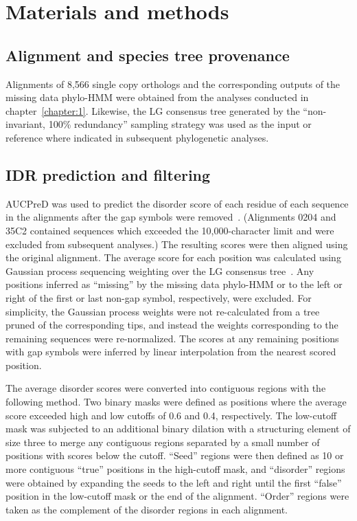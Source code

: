 \section{Materials and methods}

\subsection{Alignment and species tree provenance}
Alignments of 8,566 single copy orthologs and the corresponding outputs of the missing data phylo-HMM were obtained from the analyses conducted in chapter~\ref{chapter:1}. Likewise, the LG consensus tree generated by the ``non-invariant, 100\% redundancy'' sampling strategy was used as the input or reference where indicated in subsequent phylogenetic analyses.

\subsection{IDR prediction and filtering}
AUCPreD was used to predict the disorder score of each residue of each sequence in the alignments after the gap symbols were removed~\cite{Wang2016}. (Alignments 0204 and 35C2 contained sequences which exceeded the 10,000-character limit and were excluded from subsequent analyses.) The resulting scores were then aligned using the original alignment. The average score for each position was calculated using Gaussian process sequencing weighting over the LG consensus tree~\cite{Altschul1989}. Any positions inferred as ``missing'' by the missing data phylo-HMM or to the left or right of the first or last non-gap symbol, respectively, were excluded. For simplicity, the Gaussian process weights were not re-calculated from a tree pruned of the corresponding tips, and instead the weights corresponding to the remaining sequences were re-normalized. The scores at any remaining positions with gap symbols were inferred by linear interpolation from the nearest scored position.

The average disorder scores were converted into contiguous regions with the following method. Two binary masks were defined as positions where the average score exceeded high and low cutoffs of 0.6 and 0.4, respectively. The low-cutoff mask was subjected to an additional binary dilation with a structuring element of size three to merge any contiguous regions separated by a small number of positions with scores below the cutoff. ``Seed'' regions were then defined as 10 or more contiguous ``true'' positions in the high-cutoff mask, and ``disorder'' regions were obtained by expanding the seeds to the left and right until the first ``false'' position in the low-cutoff mask or the end of the alignment. ``Order'' regions were taken as the complement of the disorder regions in each alignment.

